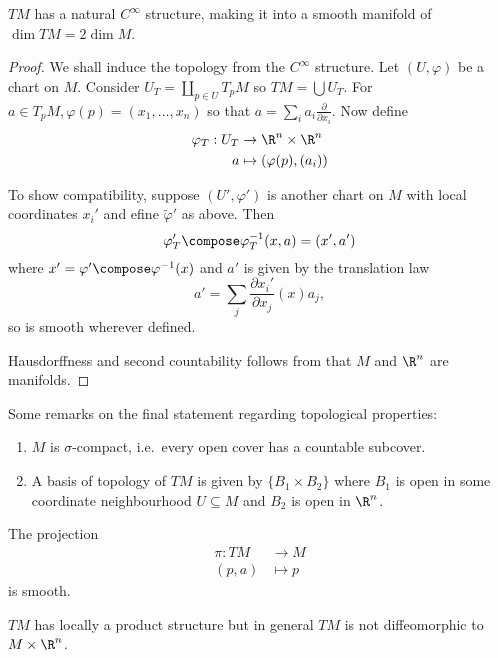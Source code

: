 \documentclass[a4paper]{article}
\begin{document}
\begin{theorem}
  \(TM\) has a natural \(C^\infty\) structure, making it into a smooth manifold of \(\dim TM = 2 \dim M\).
\end{theorem}

\begin{proof}
  We shall induce the topology from the \(C^\infty\) structure. Let \((U, \varphi)\) be a chart on \(M\). Consider \(U_T = \coprod_{p \in U} T_pM\) so \(TM = \bigcup U_T\). For \(a \in T_pM, \varphi(p) = (x_1, \dots, x_n)\) so that \(a = \sum_i a_i \frac{\partial  }{\partial x_i}\). Now define
  \begin{align*}
    \varphi_T: U_T &\to \R^n \times \R^n \\
    a &\mapsto (\varphi(p), (a_i))
  \end{align*}

  To show compatibility, suppose \((U', \varphi')\) is another chart on \(M\) with local coordinates \(x_i'\) and efine \(\tilde \varphi'\) as above. Then
  \[
    \varphi_T' \compose \varphi_T^{-1}(x, a)
    = (x', a')
  \]
  where \(x' = \varphi' \compose \varphi^{-1}(x)\) and \(a'\) is given by the translation law
  \[
    a' = \sum_j \frac{\partial x_i'}{\partial x_j} (x) a_j,
  \]
  so is smooth wherever defined.

  Hausdorffness and second countability follows from that \(M\) and \(\R^n\) are manifolds.
\end{proof}

\begin{note}
  Some remarks on the final statement regarding topological properties:
  \begin{enumerate}
  \item \(M\) is \(\sigma\)-compact, i.e.\ every open cover has a countable subcover.
  \item A basis of topology of \(TM\) is given by \(\{B_1 \times B_2\}\) where \(B_1\) is open in some coordinate neighbourhood \(U \subseteq M\) and \(B_2\) is open in \(\R^n\).
  \end{enumerate}
\end{note}

\begin{corollary}
  The projection
  \begin{align*}
    \pi: TM &\to M \\
    (p, a) &\mapsto p
  \end{align*}
  is smooth.
\end{corollary}

\begin{remark}
  \(TM\) has locally a product structure but in general \(TM\) is not diffeomorphic to \(M \times \R^n\).
\end{remark}
\end{document}
